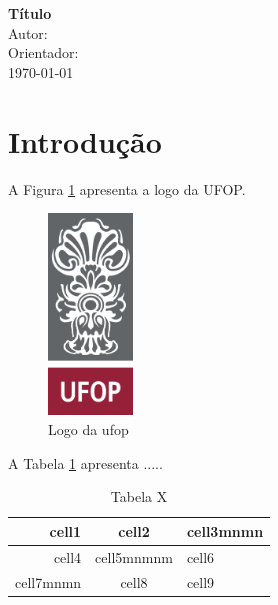 \documentclass[12pt,a4paper, brazil]{article}
\begin{document}
\begin{center}
{\textbf {\huge Título}}\\[5mm]
{\large Autor: } \\[2mm]
{\large Orientador: } \\[5mm]
\today\\[5mm] %
\end{center}



\section{Introdução}

A Figura \ref{fig:logo_ufop} apresenta a logo da UFOP.

\begin{figure}[!ht]
    \centering
    \includegraphics[width=0.2\textwidth]{ufop-logo.jpg}
    \caption{Logo da ufop}
    \label{fig:logo_ufop}
\end{figure}

A Tabela \ref{tab:tabx} apresenta .....

\begin{table}[!ht]
    \centering
    \begin{tabular}{ |r|c|l| }
        \hline
         cell1 & cell2 & cell3mnmn \\
         \hline
         \hline 
         cell4 & cell5mnmnm & cell6 \\
         \hline
         cell7mnmn & cell8 & cell9 \\
         \hline   
        \end{tabular}
        \caption{Tabela X}
        \label{tab:tabx}
\end{table}
\end{document}
